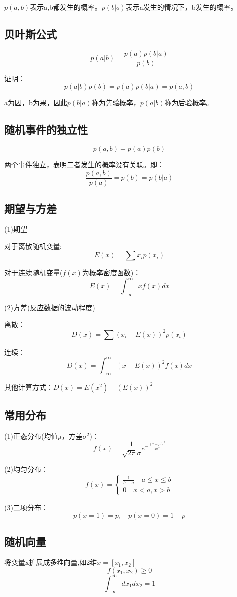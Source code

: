 \documentclass[UTF8]{ctexart} %
\begin{document}
		\qquad $p(a,b)$表示a,b都发生的概率。$p(b|a)$表示a发生的情况下，b发生的概率。
		
		\subsection{贝叶斯公式}
		\[p(a|b)= \frac{p(a)p(b|a)}{p(b)}\]
		
		\qquad 证明：
		\[p(a|b)p(b)=p(a)p(b|a)=p(a,b)\]
		
		\qquad a为因，b为果，因此$p(b|a)$称为先验概率，$p(a|b)$称为后验概率。
		
		\subsection{随机事件的独立性}
		\[p(a,b)=p(a)p(b)\]
		
		\qquad 两个事件独立，表明二者发生的概率没有关联。即：
		\[\frac{p(a,b)}{p(a)}= p(b)=p(b|a)\]
		
		\subsection{期望与方差}
		(1)期望
		
		\qquad 对于离散随机变量:
		\[E(x)=\sum x_i p(x_i)\]
		
		\qquad 对于连续随机变量($f(x)$为概率密度函数)：
		\[E(x)=\int_{-\infty}^\infty xf(x)dx\]	
		
		(2)方差(反应数据的波动程度)
			
		\qquad 离散：
		\[D(x)=\sum(x_i-E(x))^2 p(x_i)\]
		
		\qquad 连续：
		\[D(x)=\int_{-\infty}^\infty (x-E(x))^2f(x)dx\]
		
		\qquad 其他计算方式：$D(x)=E(x^2)-(E(x))^2$
		
		\subsection{常用分布}
		(1)正态分布(均值$\mu$，方差$\sigma^2$)：
		\[f(x)=\frac{1}{\sqrt{2\pi}\sigma} e^{-\frac{(x-\mu)^2}{2\sigma^2}}\]
		
		(2)均匀分布：
		\[f(x)=\begin{cases}
			\frac{1}{b-a} \quad a\leq x \leq b\\
			0\quad x<a,x>b
		\end{cases}\]
		
		(3)二项分布：
		\[p(x=1)=p,\quad p(x=0)=1-p\]
		
		\subsection{随机向量}
		将变量x扩展成多维向量,如2维$x=[x_1,x_2]$
		\[f(x_1,x_2)\geq0\]
		\[\int_{-\infty}^\infty dx_1 dx_2=1\]
		
\end{document}
